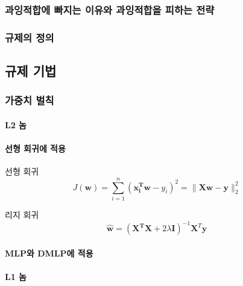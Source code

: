 \documentclass [12pt] {oblivoir}
\let\oldsubsubsection=\subsubsection
\renewcommand{\subsubsection}
{
  \filbreak
  \oldsubsubsection
}
\begin{document}
\subsubsection{과잉적합에 빠지는 이유와 과잉적합을 피하는 전략}

\subsubsection{규제의 정의}

\subsection{규제 기법}

\subsubsection{가중치 벌칙}

\paragraph*{L2 놈}\mbox{}

\vspace{3mm}

\paragraph*{선형 회귀에 적용}\mbox{}

선형 회귀
\begin{equation} \tag{5.26}
  J(\mathbf{w}) = \sum_{i=1}^{n}(\mathbf{x_{i}^{T}w} - y_{i})^{2} = \lVert \mathbf{Xw - y} \rVert_{2}^{2}
\end{equation}

리지 회귀
\begin{equation} \tag{5.29}
  \mathbf{\hat{w}} = (\mathbf{X^{T}X} + 2\lambda \mathbf{I})^{-1}\mathbf{X}^{T}\mathbf{y}
\end{equation}

\vspace{3mm}

\paragraph*{MLP와 DMLP에 적용}\mbox{}

\vspace{3mm}

\paragraph*{L1 놈}\mbox{}
\end{document}
